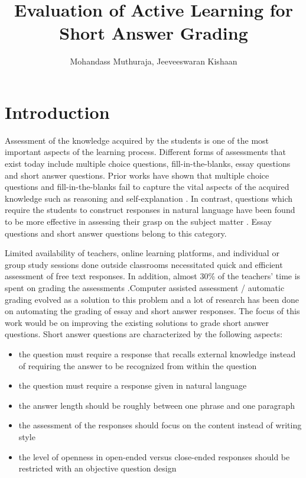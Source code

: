 \documentclass[rnd]{mas_proposal}
\title{Evaluation of Active Learning for Short Answer Grading}
\author{Mohandass Muthuraja, Jeeveeswaran Kishaan}
\begin{document}
\maketitle

\pagestyle{plain}

\chapter{Introduction}

\vspace{4mm}
 
Assessment of the knowledge acquired by the students is one of the most important aspects of the learning process. Different forms of assessments that exist today include multiple choice questions, fill-in-the-blanks, essay questions and short answer questions. Prior works have shown that multiple choice questions and fill-in-the-blanks fail to capture the vital aspects of the acquired knowledge such as reasoning and self-explanation \cite{Wang2008}. In contrast, questions which require the students to construct responses in natural language have been found to be more effective in assessing their grasp on the subject matter \cite{Roy2016a}. Essay questions and short answer questions belong to this category.  

\vspace{4mm}

Limited availability of teachers, online learning platforms, and individual or group study sessions done outside classrooms necessitated quick and efficient assessment of free text responses. In addition, almost 30\% of the teachers' time is spent on grading the assessments \cite{mason2002}.Computer assisted assessment / automatic grading evolved as a solution to this problem and a lot of research has been done on automating the grading of essay\cite{Higgins2004} and short answer responses\cite{Leacock2003, Pulman2005, Mohler2009}. The focus of this work would be on improving the existing solutions to grade short answer questions. Short answer questions are characterized by the following aspects\cite{Burrows2015}:

\begin{itemize}

\item the question must require a response that recalls external knowledge instead of requiring the answer to be recognized from within the question

\item the question must require a response given in natural language

\item the answer length should be roughly between one phrase and one paragraph

\item the assessment of the responses should focus on the content instead of writing style

\item the level of openness in open-ended versus close-ended responses should be restricted with an objective question design 

\end{itemize}
\end{document}
